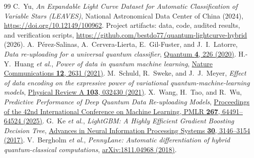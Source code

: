 \documentclass[aps,a4paper,onecolumn,11pt,unpublished]{quantumarticle}
\begin{document}
\begin{thebibliography}{99}
 C.~Yu, \emph{An Expandable Light Curve Dataset for Automatic Classification of Variable Stars (LEAVES)}, National Astronomical Data Center of China (2024), \url{https://doi.org/10.12149/100962}.
 Project artifacts: data, code, audited results, and verification scripts, \url{https://github.com/bestdo77/quantum-lightcurve-hybrid} (2026).
 A.~P\'erez-Salinas, A.~Cervera-Lierta, E.~Gil-Fuster, and J.~I.~Latorre, \emph{Data re-uploading for a universal quantum classifier}, \href{https://doi.org/10.22331/q-2020-02-06-226}{Quantum \textbf{4}, 226 (2020)}.
 H.-Y.~Huang \emph{et al.}, \emph{Power of data in quantum machine learning}, \href{https://doi.org/10.1038/s41467-021-22539-9}{Nature Communications \textbf{12}, 2631 (2021)}.
 M.~Schuld, R.~Sweke, and J.~J.~Meyer, \emph{Effect of data encoding on the expressive power of variational quantum-machine-learning models}, \href{https://doi.org/10.1103/PhysRevA.103.032430}{Physical Review A \textbf{103}, 032430 (2021)}.
 X.~Wang, H.~Tao, and R.~Wu, \emph{Predictive Performance of Deep Quantum Data Re-uploading Models}, \href{https://proceedings.mlr.press/v267/wang25cw.html}{Proceedings of the 42nd International Conference on Machine Learning, PMLR \textbf{267}, 64491--64524 (2025)}.
 G.~Ke \emph{et al.}, \emph{LightGBM: A Highly Efficient Gradient Boosting Decision Tree}, \href{https://proceedings.neurips.cc/paper_files/paper/2017/hash/6449f44a102fde848669bdd9eb6b76fa-Abstract.html}{Advances in Neural Information Processing Systems \textbf{30}, 3146--3154 (2017)}.
 V.~Bergholm \emph{et al.}, \emph{PennyLane: Automatic differentiation of hybrid quantum-classical computations}, \href{https://arxiv.org/abs/1811.04968}{arXiv:1811.04968 (2018)}.
\end{thebibliography}
\end{document}
